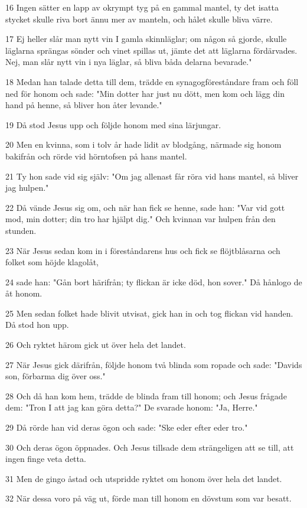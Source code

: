 \par 16 Ingen sätter en lapp av okrympt tyg på en gammal mantel, ty det isatta stycket skulle riva bort ännu mer av manteln, och hålet skulle bliva värre.
\par 17 Ej heller slår man nytt vin I gamla skinnläglar; om någon så gjorde, skulle läglarna sprängas sönder och vinet spillas ut, jämte det att läglarna fördärvades. Nej, man slår nytt vin i nya läglar, så bliva båda delarna bevarade."
\par 18 Medan han talade detta till dem, trädde en synagogföreståndare fram och föll ned för honom och sade: "Min dotter har just nu dött, men kom och lägg din hand på henne, så bliver hon åter levande."
\par 19 Då stod Jesus upp och följde honom med sina lärjungar.
\par 20 Men en kvinna, som i tolv år hade lidit av blodgång, närmade sig honom bakifrån och rörde vid hörntofsen på hans mantel.
\par 21 Ty hon sade vid sig själv: "Om jag allenast får röra vid hans mantel, så bliver jag hulpen."
\par 22 Då vände Jesus sig om, och när han fick se henne, sade han: "Var vid gott mod, min dotter; din tro har hjälpt dig." Och kvinnan var hulpen från den stunden.
\par 23 När Jesus sedan kom in i föreståndarens hus och fick se flöjtblåsarna och folket som höjde klagolåt,
\par 24 sade han: "Gån bort härifrån; ty flickan är icke död, hon sover." Då hånlogo de åt honom.
\par 25 Men sedan folket hade blivit utvisat, gick han in och tog flickan vid handen. Då stod hon upp.
\par 26 Och ryktet härom gick ut över hela det landet.
\par 27 När Jesus gick därifrån, följde honom två blinda som ropade och sade: "Davids son, förbarma dig över oss."
\par 28 Och då han kom hem, trädde de blinda fram till honom; och Jesus frågade dem: "Tron I att jag kan göra detta?" De svarade honom: "Ja, Herre."
\par 29 Då rörde han vid deras ögon och sade: "Ske eder efter eder tro."
\par 30 Och deras ögon öppnades. Och Jesus tillsade dem strängeligen att se till, att ingen finge veta detta.
\par 31 Men de gingo åstad och utspridde ryktet om honom över hela det landet.
\par 32 När dessa voro på väg ut, förde man till honom en dövstum som var besatt.
